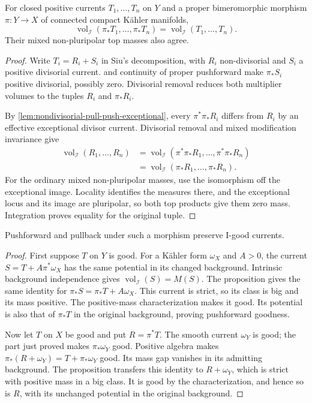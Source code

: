 \begin{proposition}\label{prop:pushforward-mixed-volume-and-mass}
For closed positive currents $T_1,\ldots,T_n$ on $Y$ and a proper bimeromorphic morphism $\pi:Y\to X$ of connected compact K\"ahler manifolds,
\[
 \operatorname{vol}_{\mathcal I}(\pi_*T_1,\ldots,\pi_*T_n)
               =\operatorname{vol}_{\mathcal I}(T_1,\ldots,T_n).
\]
Their mixed non-pluripolar top masses also agree.
\end{proposition}
\begin{proof}
Write $T_i=R_i+S_i$ in Siu's decomposition, with $R_i$ non-divisorial and $S_i$ a positive divisorial current.  and continuity of proper pushforward make $\pi_*S_i$ positive divisorial, possibly zero. Divisorial removal reduces both multiplier volumes to the tuples $R_i$ and $\pi_*R_i$.

By \cref{lem:nondivisorial-pull-push-exceptional}, every $\pi^*\pi_*R_i$ differs from $R_i$ by an effective exceptional divisor current. Divisorial removal and mixed modification invariance give
\[
 \begin{aligned}
 \operatorname{vol}_{\mathcal I}(R_1,\ldots,R_n)
  &=\operatorname{vol}_{\mathcal I}(\pi^*\pi_*R_1,\ldots,\pi^*\pi_*R_n)\\
  &=\operatorname{vol}_{\mathcal I}(\pi_*R_1,\ldots,\pi_*R_n).
 \end{aligned}
\]
For the ordinary mixed non-pluripolar masses, use the isomorphism off the exceptional image. Locality identifies the measures there, and the exceptional locus and its image are pluripolar, so both top products give them zero mass. Integration proves equality for the original tuple.
\end{proof}

\begin{corollary}\label{cor:i-good-under-modifications}
Pushforward and pullback under such a morphism preserve I-good currents.
\end{corollary}
\begin{proof}
First suppose $T$ on $Y$ is good. For a K\"ahler form $\omega_X$ and $A>0$, the current $S=T+A\pi^*\omega_X$ has the same potential in its changed background. Intrinsic background independence gives
$\operatorname{vol}_{\mathcal I}(S)=M(S)$.
The proposition gives the same identity for $\pi_*S=\pi_*T+A\omega_X$. This current is strict, so its class is big and its mass positive. The positive-mass characterization makes it good. Its potential is also that of $\pi_*T$ in the original background, proving pushforward goodness.

Now let $T$ on $X$ be good and put $R=\pi^*T$. The smooth current $\omega_Y$ is good; the part just proved makes $\pi_*\omega_Y$ good. Positive algebra makes
$\pi_*(R+\omega_Y)=T+\pi_*\omega_Y$ good. Its mass gap vanishes in its admitting background. The proposition transfers this identity to $R+\omega_Y$, which is strict with positive mass in a big class. It is good by the characterization, and hence so is $R$, with its unchanged potential in the original background.
\end{proof}

